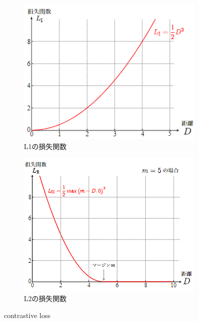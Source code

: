 \documentclass{ltjsarticle}
\begin{document}
\begin{figure}[htbp]
  \centering
  \begin{subfigure}[b]{0.45\textwidth}
    \centering
    \includegraphics[width=\textwidth]{./capture/Siamese_L1.png}
    \caption{L1の損失関数}
    \label{fig:Siamese_L1}
  \end{subfigure}
  \hfill
  \begin{subfigure}[b]{0.45\textwidth}
    \centering
    \includegraphics[width=\textwidth]{./capture/Siamese_L2.png}
    \caption{L2の損失関数}
    \label{fig:Siamese_L2}
  \end{subfigure}
  \caption{contrastive loss}
\end{figure}
\end{document}
